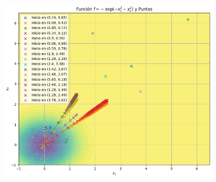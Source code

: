 \begin{itemize}
\begin{figure}
    \centering
    \includegraphics[width=0.65\linewidth]{figuras/PREG7_ARMIJO.png}
    \label{fig:enter-label}
\end{figure}

\end{itemize}
